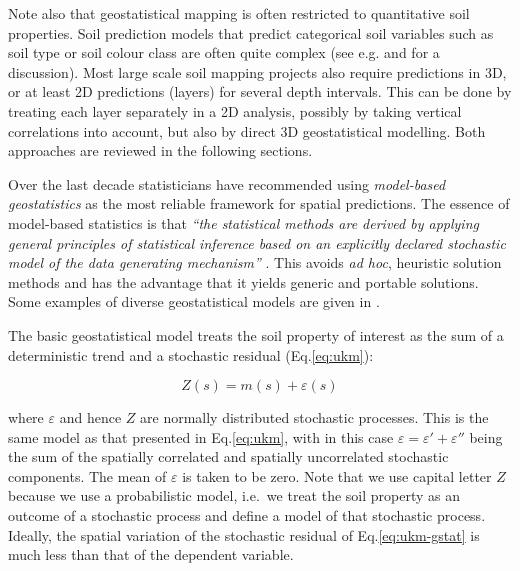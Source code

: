 \documentclass[graybox,natbib,nospthms,UStrade]{svmono}
\begin{document}
Note also that geostatistical mapping is often restricted to
quantitative soil properties. Soil prediction models that predict
categorical soil variables such as soil type or soil colour class are
often quite complex (see e.g. \citet{Hengl2007Geoderma} and \citet{Kempen2009Geoderma}
for a discussion). Most large scale soil mapping projects also require
predictions in 3D, or at least 2D predictions (layers) for several depth
intervals. This can be done by treating each layer separately in a 2D
analysis, possibly by taking vertical correlations into account, but
also by direct 3D geostatistical modelling. Both approaches are reviewed
in the following sections.

Over the last decade statisticians have recommended using
\emph{model-based geostatistics} as the most reliable framework for spatial predictions.
The essence of model-based statistics is that \emph{``the statistical methods
are derived by applying general principles of statistical inference based
on an explicitly declared stochastic model of the data generating mechanism''}
\citep{Diggle2007Springer, Brown2014JSS}. This avoids \emph{ad hoc}, heuristic
solution methods and has the advantage that it yields generic and
portable solutions. Some examples of diverse geostatistical models are
given in \citet{Brown2014JSS}.

The basic geostatistical model treats the soil property of interest as
the sum of a deterministic trend and a stochastic residual
(Eq.\eqref{eq:ukm}):

\begin{equation}
Z({s}) = m({s}) + \varepsilon({s})
\label{eq:ukm-gstat}
\end{equation}

where \(\varepsilon\) and hence \(Z\) are normally distributed stochastic
processes. This is the same model as that presented in Eq.\eqref{eq:ukm},
with in this case \(\varepsilon = \varepsilon ' + \varepsilon ''\) being
the sum of the spatially correlated and spatially uncorrelated
stochastic components. The mean of \(\varepsilon\) is taken to be zero.
Note that we use capital letter \(Z\) because we use a probabilistic
model, i.e.~we treat the soil property as an outcome of a stochastic
process and define a model of that stochastic process.
Ideally, the spatial variation of the stochastic residual
of Eq.\eqref{eq:ukm-gstat} is much less than that of
the dependent variable.
\end{document}
